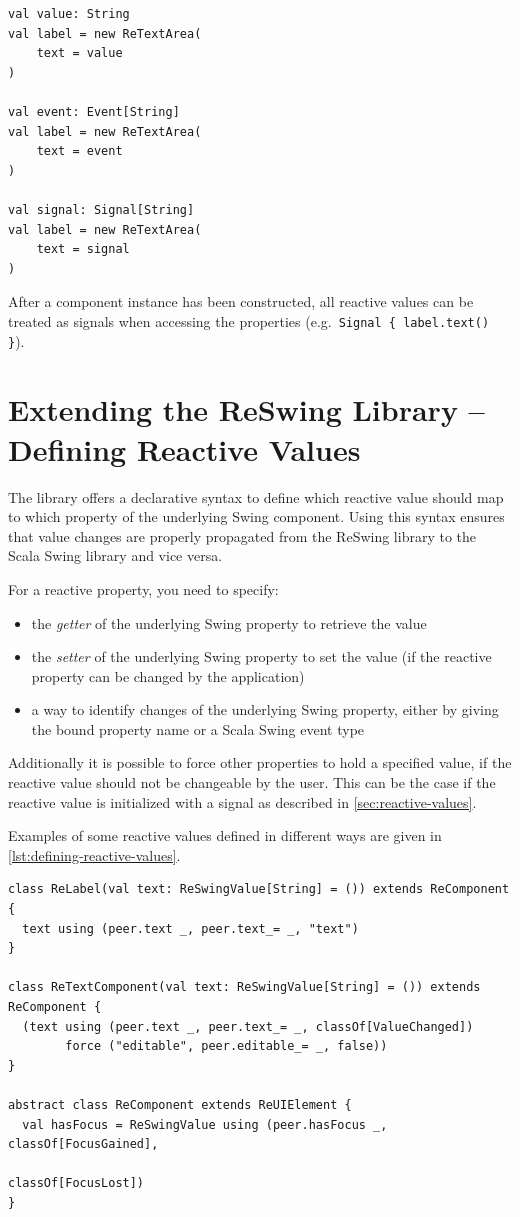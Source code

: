 \documentclass{scrartcl}
\begin{document}
\hspace{1em}\begin{lstlisting}[caption={Initializing a reactive value of a ReSwing component},label={lst:initializing-reactive-values}]
val value: String
val label = new ReTextArea(
    text = value 
)

val event: Event[String]
val label = new ReTextArea(
    text = event
)

val signal: Signal[String] 
val label = new ReTextArea( 
    text = signal 
)
\end{lstlisting}

After a component instance has been constructed, all reactive values can be treated as signals when accessing the properties (e.g.\ \texttt{Signal \{ label.text() \}}).

\section{Extending the ReSwing Library -- Defining Reactive Values}
\label{sec:defining-reactive-values}
The library offers a declarative syntax to define which reactive value should map to which property of the underlying Swing component. Using this syntax ensures that value changes are properly propagated from the ReSwing library to the Scala Swing library and vice versa.

For a reactive property, you need to specify:
\begin{itemize}
\item the \emph{getter} of the underlying Swing property to retrieve the value
\item the \emph{setter} of the underlying Swing property to set the value (if the reactive property can be changed by the application)
\item a way to identify changes of the underlying Swing property, either by giving the bound property name or a Scala Swing event type
\end{itemize}
Additionally it is possible to force other properties to hold a specified value, if the reactive value should not be changeable by the user. This can be the case if the reactive value is initialized with a signal as described in \cref{sec:reactive-values}.

Examples of some reactive values defined in different ways are given in \cref{lst:defining-reactive-values}.

\hspace{1em}\begin{lstlisting}[caption={Defining Reactive Values},label={lst:defining-reactive-values}]
class ReLabel(val text: ReSwingValue[String] = ()) extends ReComponent {
  text using (peer.text _, peer.text_= _, "text")
}

class ReTextComponent(val text: ReSwingValue[String] = ()) extends ReComponent {
  (text using (peer.text _, peer.text_= _, classOf[ValueChanged])
        force ("editable", peer.editable_= _, false))
}

abstract class ReComponent extends ReUIElement {
  val hasFocus = ReSwingValue using (peer.hasFocus _, classOf[FocusGained],
                                                      classOf[FocusLost])
}
\end{lstlisting}
\end{document}
